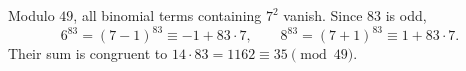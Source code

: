 Modulo $49$, all binomial terms containing $7^2$ vanish. Since $83$ is odd,
\[
6^{83}=(7-1)^{83}\equiv-1+83\cdot7,\qquad
8^{83}=(7+1)^{83}\equiv1+83\cdot7.
\]
Their sum is congruent to $14\cdot83=1162\equiv\boxed{35}\pmod{49}$.
